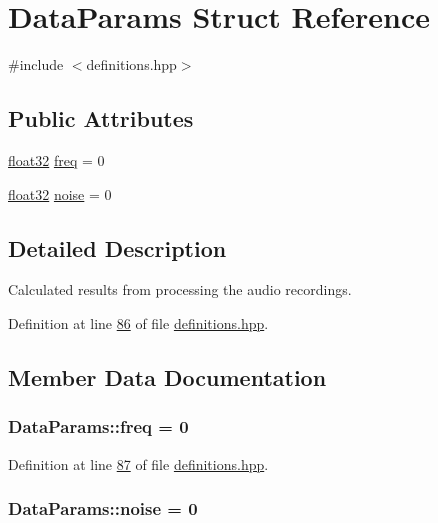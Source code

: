 \hypertarget{structDataParams}{\section{Data\+Params Struct Reference}
\label{structDataParams}
}


{\ttfamily \#include $<$definitions.\+hpp$>$}

\subsection*{Public Attributes}
\begin{DoxyCompactItemize}
\item 
\hyperlink{definitions_8hpp_aacdc525d6f7bddb3ae95d5c311bd06a1}{float32} \hyperlink{structDataParams_a12566e017407647bc8287d62554ad3fb}{freq} = 0
\item 
\hyperlink{definitions_8hpp_aacdc525d6f7bddb3ae95d5c311bd06a1}{float32} \hyperlink{structDataParams_a4efd1d2231c6fa7c878c9d5e1650738f}{noise} = 0
\end{DoxyCompactItemize}


\subsection{Detailed Description}
Calculated results from processing the audio recordings. 

Definition at line \hyperlink{definitions_8hpp_source_l00086}{86} of file \hyperlink{definitions_8hpp_source}{definitions.\+hpp}.



\subsection{Member Data Documentation}
\hypertarget{structDataParams_a12566e017407647bc8287d62554ad3fb}{
\subsubsection[{freq}]{ Data\+Params\+::freq = 0}}\label{structDataParams_a12566e017407647bc8287d62554ad3fb}


Definition at line \hyperlink{definitions_8hpp_source_l00087}{87} of file \hyperlink{definitions_8hpp_source}{definitions.\+hpp}.

\hypertarget{structDataParams_a4efd1d2231c6fa7c878c9d5e1650738f}{
\subsubsection[{noise}]{ Data\+Params\+::noise = 0}}\label{structDataParams_a4efd1d2231c6fa7c878c9d5e1650738f}


